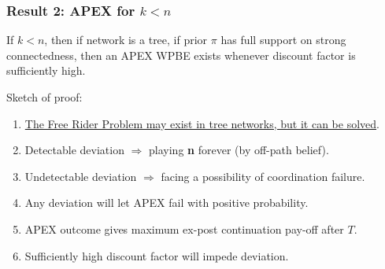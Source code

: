 \documentclass[10pt]{beamer}
\begin{document}
\begin{frame}
\frametitle{Result 2: APEX for $k<n$}
\begin{theorem}[\alert{$k< n$}]
If $k<n$, then if network is a \alert{tree}, if prior $\pi$ has \alert{full support on strong connectedness}, then an APEX WPBE {exists} whenever discount factor is sufficiently high.
\end{theorem}

Sketch of proof:
\begin{enumerate}
\item \underline{The Free Rider Problem may exist in tree networks, but it can be solved}.
\item Detectable deviation $\Rightarrow$ playing \textbf{n} forever (by off-path belief).
\item Undetectable deviation $\Rightarrow$ facing a possibility of coordination failure.
\item Any deviation will let APEX fail with positive probability.
\item APEX outcome gives maximum ex-post continuation pay-off after $T$.
\item Sufficiently high discount factor will impede deviation.
\end{enumerate}



\end{frame}
\end{document}
